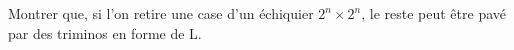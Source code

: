 Montrer que, si l'on retire une case d'un échiquier $2^n \times 2^n$, le reste peut être pavé par des triminos en forme de L.
